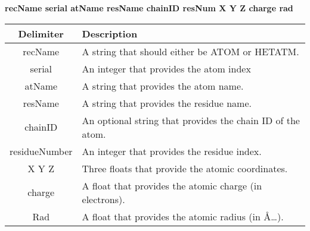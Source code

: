 \textbf{recName  serial  atName  resName  chainID  resNum  X  Y  Z  charge rad }\\

  \begin{tabular}{ c | l  }
    \textbf{Delimiter} & \textbf{Description} \\ \hline
recName 	&	A string that should either be ATOM or HETATM. \\
serial 	&	An integer that provides the atom index \\
atName 	&	A string that provides the atom name.\\
resName	&	A string that provides the residue name. \\
chainID	&	An optional string that provides the chain ID of the atom.\\
residueNumber  & An integer that provides the residue index.\\
X Y Z	& Three floats that provide the atomic coordinates.\\
charge	& A float that provides the atomic charge (in electrons). \\
Rad		& A float that provides the atomic radius (in \AA…).\\
    \hline
  \end{tabular}


\clearpage

